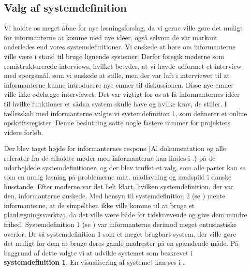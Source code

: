 \subsection{Valg af systemdefinition}
\label{subsec:valgafsystemdefinition}

Vi holdte os meget åbne for nye løsningsforslag, da vi gerne ville gøre det muligt for informanterne at komme med nye idéer, også selvom de var markant anderledes end vores systemdefinitioner. Vi ønskede at høre om informanterne ville være i stand til bruge lignende systemer. Derfor foregik møderne som semistrukturerede interviews, hvilket betyder, at vi havde udformet et interview med spørgsmål, som vi ønskede at stille, men der var luft i interviewet til at informanterne kunne introducere nye emner til diskussionen. Disse nye emner ville ikke ødelægge interviewet. Det var vigtigt for os at få informanternes idéer til hvilke funktioner et sådan system skulle have og hvilke krav, de stiller. I fællesskab med informanterne valgte vi systemdefinition 1, som definerer et online opskriftsregister. Denne beslutning satte nogle fastere rammer for projektets videre forløb. 

Der blev taget højde for informanternes respons (Al dokumentation og alle referater fra de afholdte møder med informanterne kan findes i .) på de udarbejdede systemdefinitioner, og der blev truffet et valg, som alle parter kan se som en mulig løsning på problemerne mht. madlavning og madspild i danske husstande. Efter møderne var det helt klart, hvilken systemdefinition, der var den, informanterne ønskede. Med hensyn til systemdefinition 2 (se ) mente informanterne, at de simpelthen ikke ville komme til at bruge et planlægningsværktøj, da det ville være både for tidskrævende og give dem mindre frihed. Systemdefinition 1 (se ) var informanterne derimod meget entusiastiske overfor. De så systemdefinition 1 som et meget brugbart system, der ville gøre det muligt for dem at bruge deres gamle madrester på en spændende måde. På baggrund af dette valgte vi at udvikle systemet som beskrevet i \textbf{systemdefinition 1}. En visualisering af systemet kan ses i .

